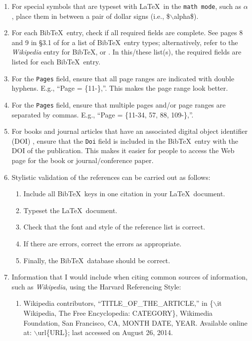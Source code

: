 \documentclass[letter,12pt]{article}
\begin{document}
\begin{enumerate}
\begin{enumerate}
	\end{enumerate}
\item For special symbols that are typeset with \LaTeX\ in the {\tt math mode}, such as $\alpha$, place them in between a pair of dollar signs (i.e., \$$\backslash$alpha\$).
\item For each {\sc Bib}\TeX\ entry, check if all required fields are complete. See pages 8 and 9 in \S3.1 of \cite{Patashnik1988} for a list of {\sc Bib}\TeX\ entry types; alternatively, refer to the {\it Wikipedia} entry for {\sc Bib}\TeX, or \cite[\S12.2.1, pp. 230--231]{Kopka2004}. In this/these list(s), the required fields are listed for each {\sc Bib}\TeX\ entry.
\item For the {\tt Pages} field, ensure that all page ranges are indicated with double hyphens. E.g., ``Page = \{11-\},''. This makes the page range look better.
\item For the {\tt Pages} field, ensure that multiple pages and/or page ranges are separated by commas. E.g., ``Page = \{11-34, 57, 88, 109-\},''.
\item For books and journal articles that have an associated digital object identifier (DOI) \cite{InternationalDOIFoundationStaff2017}, ensure that the {\tt Doi} field is included in the {\sc Bib}\TeX\ entry with the DOI of the publication. This makes it easier for people to access the Web page for the book or journal/conference paper.
\item Stylistic validation of the references can be carried out as follows: \vspace{-0.3cm}
	\begin{enumerate} \itemsep -2pt
	\item Include all {\sc Bib}\TeX\ keys in one citation in your \LaTeX\ document.
	\item Typeset the \LaTeX\ document.
	\item Check that the font and style of the reference list is correct.
	\item If there are errors, correct the errors as appropriate.
	\item Finally, the {\sc Bib}\TeX\ database should be correct.
	\end{enumerate}
\item Information that I would include when citing common sources of information, such as {\it Wikipedia}, using the Harvard Referencing Style: \vspace{-0.3cm}
	\begin{enumerate} \itemsep -2pt
	\item Wikipedia contributors, ``TITLE\_OF\_THE\_ARTICLE,'' in \{$\backslash$it Wikipedia, The Free Encyclopedia: CATEGORY\}, Wikimedia Foundation, San Francisco, CA, MONTH DATE, YEAR. Available online at: $\backslash$url\{URL\}; last accessed on August 26, 2014.

\end{enumerate}
\end{enumerate}
\end{document}
